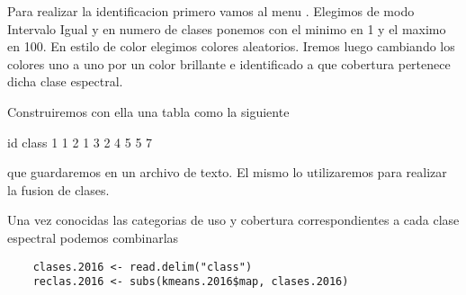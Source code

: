 \documentclass[a4paper]{article}
\begin{document}
Para realizar la identificacion primero vamos al menu . Elegimos de modo
Intervalo Igual y en numero de clases ponemos con el minimo en 1 y el maximo en
100. En estilo de color elegimos colores aleatorios. Iremos luego cambiando los
colores uno a uno por un color brillante e identificado a que cobertura
pertenece dicha clase espectral.

Construiremos con ella una tabla como la siguiente

\begin{verbatin}
    id  class
    1   1
    2   1
    3   2
    4   5
    5   7
\end{verbatin}

que guardaremos en un archivo de texto. El mismo lo utilizaremos para realizar
la fusion de clases.

Una vez conocidas las categorias de uso y cobertura correspondientes a cada
clase espectral podemos combinarlas

\begin{lstlisting}
    clases.2016 <- read.delim("class")
    reclas.2016 <- subs(kmeans.2016$map, clases.2016)
\end{lstlisting}
\end{document}
